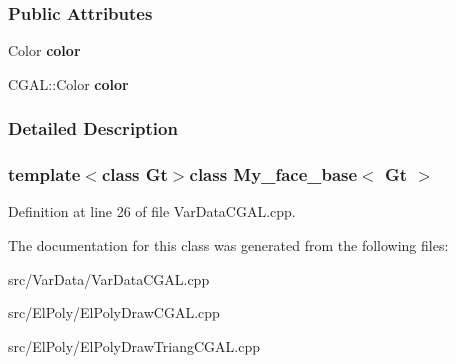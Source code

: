 \subsubsection*{\-Public \-Attributes}
\begin{DoxyCompactItemize}
\item 
\hypertarget{classMy__face__base_aefc38372916d172f9b1ef5bd996a1718}{\-Color {\bfseries color}}\label{classMy__face__base_aefc38372916d172f9b1ef5bd996a1718}

\item 
\hypertarget{classMy__face__base_aefc38372916d172f9b1ef5bd996a1718}{\-C\-G\-A\-L\-::\-Color {\bfseries color}}\label{classMy__face__base_aefc38372916d172f9b1ef5bd996a1718}

\end{DoxyCompactItemize}


\subsubsection{\-Detailed \-Description}
\subsubsection*{template$<$class Gt$>$class My\-\_\-face\-\_\-base$<$ Gt $>$}



\-Definition at line 26 of file \-Var\-Data\-C\-G\-A\-L.\-cpp.



\-The documentation for this class was generated from the following files\-:\begin{DoxyCompactItemize}
\item 
src/\-Var\-Data/\-Var\-Data\-C\-G\-A\-L.\-cpp\item 
src/\-El\-Poly/\-El\-Poly\-Draw\-C\-G\-A\-L.\-cpp\item 
src/\-El\-Poly/\-El\-Poly\-Draw\-Triang\-C\-G\-A\-L.\-cpp\end{DoxyCompactItemize}
